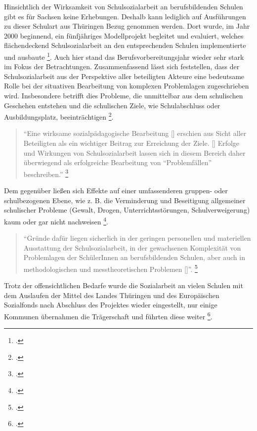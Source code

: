Hinsichtlich der Wirksamkeit von Schulsozialarbeit an berufsbildenden Schulen gibt es für Sachsen keine Erhebungen. Deshalb kann lediglich auf Ausführungen zu dieser Schulart aus Thüringen Bezug genommen werden. Dort wurde, im Jahr 2000 beginnend, ein fünfjähriges Modellprojekt begleitet und evaluiert, welches flächendeckend Schulsozialarbeit an den entsprechenden Schulen implementierte und ausbaute \footcite[vgl.][119]{Bauer2010}. Auch hier stand das Berufsvorbereitungsjahr wieder sehr stark im Fokus der Betrachtungen. Zusammenfassend lässt sich feststellen, dass der Schulsozialarbeit aus der Perspektive aller beteiligten Akteure eine bedeutsame Rolle bei der situativen Bearbeitung von komplexen Problemlagen zugeschrieben wird. Insbesondere betrifft dies Probleme, die unmittelbar aus dem schulischen Geschehen entstehen und die schulischen Ziele, wie Schulabschluss oder Ausbildungsplatz, beeinträchtigen \footcite[vgl.][129]{Bauer2010}. 

\begin{quotation}
\noindent
	"`Eine wirksame sozialpädagogische Bearbeitung [\punkte] erschien aus Sicht aller Beteiligten als ein wichtiger Beitrag zur Erreichung der Ziele. [\punkte] Erfolge und Wirkungen von Schulsozialarbeit lassen sich in diesem Bereich daher überwiegend als erfolgreiche Bearbeitung von "`Problemfällen"' beschreiben."' \footcite[131]{Bauer2010}
\end{quotation}

\noindent
 Dem gegenüber ließen sich Effekte auf einer umfassenderen gruppen- oder schulbezogenen Ebene, wie z. B. die Verminderung und Beseitigung allgemeiner schulischer Probleme (Gewalt, Drogen, Unterrichtsstörungen, Schulverweigerung) kaum oder gar nicht nachweisen \footcite[vgl.][131]{Bauer2010}. 

\begin{quotation}
\noindent
	"`Gründe dafür liegen sicherlich in der geringen personellen und materiellen Ausstattung der Schulsozialarbeit, in der gewachsenen Komplexität von Problemlagen der SchülerInnen an berufsbildenden Schulen, aber auch in methodologischen und messtheoretischen Problemen [\punkte]"'. \footcite[131f]{Bauer2010}
\end{quotation}

\noindent
 Trotz der offensichtlichen Bedarfe wurde die Sozialarbeit an vielen Schulen mit dem Auslaufen der Mittel des Landes Thüringen und des Europäischen Sozialfonds nach Abschluss des Projektes wieder eingestellt, nur einige Kommunen übernahmen die Trägerschaft und führten diese weiter \footcite[vgl.][119]{Bauer2010}. 